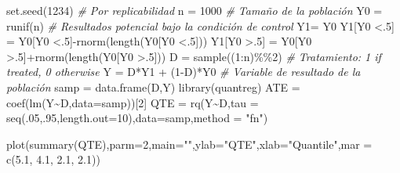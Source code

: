 \documentclass[
]{article}
\newenvironment{Shaded}{\begin{snugshade}}{\end{snugshade}}
\newcommand{\AttributeTok}[1]{\textcolor[rgb]{0.77,0.63,0.00}{#1}}
\newcommand{\CommentTok}[1]{\textcolor[rgb]{0.56,0.35,0.01}{\textit{#1}}}
\newcommand{\DecValTok}[1]{\textcolor[rgb]{0.00,0.00,0.81}{#1}}
\newcommand{\FloatTok}[1]{\textcolor[rgb]{0.00,0.00,0.81}{#1}}
\newcommand{\FunctionTok}[1]{\textcolor[rgb]{0.00,0.00,0.00}{#1}}
\newcommand{\NormalTok}[1]{#1}
\newcommand{\OtherTok}[1]{\textcolor[rgb]{0.56,0.35,0.01}{#1}}
\newcommand{\SpecialCharTok}[1]{\textcolor[rgb]{0.00,0.00,0.00}{#1}}
\newcommand{\StringTok}[1]{\textcolor[rgb]{0.31,0.60,0.02}{#1}}
\begin{document}
\begin{Shaded}
\begin{Highlighting}[]
\FunctionTok{set.seed}\NormalTok{(}\DecValTok{1234}\NormalTok{) }\CommentTok{\# Por replicabilidad}
\NormalTok{n }\OtherTok{=} \DecValTok{1000} \CommentTok{\# Tamaño de la población}
\NormalTok{Y0 }\OtherTok{=} \FunctionTok{runif}\NormalTok{(n) }\CommentTok{\# Resultados potencial bajo la condición de control}
\NormalTok{Y1}\OtherTok{=}\NormalTok{ Y0 }
\NormalTok{Y1[Y0 }\SpecialCharTok{\textless{}}\NormalTok{.}\DecValTok{5}\NormalTok{] }\OtherTok{=}\NormalTok{ Y0[Y0 }\SpecialCharTok{\textless{}}\NormalTok{.}\DecValTok{5}\NormalTok{]}\SpecialCharTok{{-}}\FunctionTok{rnorm}\NormalTok{(}\FunctionTok{length}\NormalTok{(Y0[Y0 }\SpecialCharTok{\textless{}}\NormalTok{.}\DecValTok{5}\NormalTok{])) }
\NormalTok{Y1[Y0 }\SpecialCharTok{\textgreater{}}\NormalTok{.}\DecValTok{5}\NormalTok{] }\OtherTok{=}\NormalTok{ Y0[Y0 }\SpecialCharTok{\textgreater{}}\NormalTok{.}\DecValTok{5}\NormalTok{]}\SpecialCharTok{+}\FunctionTok{rnorm}\NormalTok{(}\FunctionTok{length}\NormalTok{(Y0[Y0 }\SpecialCharTok{\textgreater{}}\NormalTok{.}\DecValTok{5}\NormalTok{])) }
\NormalTok{D }\OtherTok{=} \FunctionTok{sample}\NormalTok{((}\DecValTok{1}\SpecialCharTok{:}\NormalTok{n)}\SpecialCharTok{\%\%}\DecValTok{2}\NormalTok{) }\CommentTok{\# Tratamiento: 1 if treated, 0 otherwise }
\NormalTok{Y }\OtherTok{=}\NormalTok{ D}\SpecialCharTok{*}\NormalTok{Y1 }\SpecialCharTok{+}\NormalTok{ (}\DecValTok{1}\SpecialCharTok{{-}}\NormalTok{D)}\SpecialCharTok{*}\NormalTok{Y0 }\CommentTok{\# Variable de resultado de la población }
\NormalTok{samp }\OtherTok{=} \FunctionTok{data.frame}\NormalTok{(D,Y) }
\FunctionTok{library}\NormalTok{(quantreg) }
\NormalTok{ATE }\OtherTok{=} \FunctionTok{coef}\NormalTok{(}\FunctionTok{lm}\NormalTok{(Y}\SpecialCharTok{\textasciitilde{}}\NormalTok{D,}\AttributeTok{data=}\NormalTok{samp))[}\DecValTok{2}\NormalTok{] }
\NormalTok{QTE }\OtherTok{=} \FunctionTok{rq}\NormalTok{(Y}\SpecialCharTok{\textasciitilde{}}\NormalTok{D,}\AttributeTok{tau =} 
\FunctionTok{seq}\NormalTok{(.}\DecValTok{05}\NormalTok{,.}\DecValTok{95}\NormalTok{,}\AttributeTok{length.out=}\DecValTok{10}\NormalTok{),}\AttributeTok{data=}\NormalTok{samp,}\AttributeTok{method =} \StringTok{"fn"}\NormalTok{) }

\FunctionTok{plot}\NormalTok{(}\FunctionTok{summary}\NormalTok{(QTE),}\AttributeTok{parm=}\DecValTok{2}\NormalTok{,}\AttributeTok{main=}\StringTok{""}\NormalTok{,}\AttributeTok{ylab=}\StringTok{"QTE"}\NormalTok{,}\AttributeTok{xlab=}\StringTok{"Quantile"}\NormalTok{,}\AttributeTok{mar =} \FunctionTok{c}\NormalTok{(}\FloatTok{5.1}\NormalTok{, }\FloatTok{4.1}\NormalTok{, }\FloatTok{2.1}\NormalTok{, }\FloatTok{2.1}\NormalTok{)) }
\end{Highlighting}
\end{Shaded}
\end{document}
